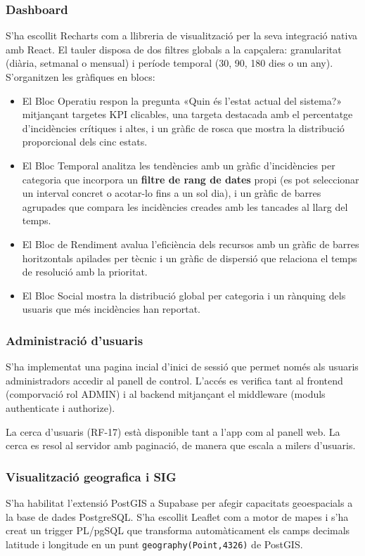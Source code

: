 \documentclass[10pt,a4paper,twocolumn,twoside]{article}
\begin{document}
		\subsubsection{Dashboard}
		S'ha escollit Recharts com a llibreria de visualització per la seva integració
		nativa amb React. El tauler disposa de dos filtres globals a la capçalera: granularitat (diària, setmanal o mensual) i període temporal (30, 90, 180 dies o un any). S'organitzen les gràfiques en blocs:
		
		\begin{itemize}
			\item El Bloc Operatiu respon la pregunta «Quin és l'estat actual del sistema?»
			mitjançant targetes KPI clicables, una targeta destacada amb el percentatge d'incidències crítiques i altes, i un gràfic de rosca que mostra la
			distribució proporcional dels cinc estats.
			\item El Bloc Temporal analitza les tendències amb un gràfic d'incidències per categoria que incorpora un \textbf{filtre de rang de dates} propi (es pot seleccionar un interval concret o acotar-lo fins a un sol dia), i un gràfic de barres agrupades que compara les incidències creades amb les tancades al llarg del temps.
			\item El Bloc de Rendiment avalua l'eficiència dels recursos amb un gràfic de
			barres horitzontals apilades per tècnic i un gràfic de dispersió que relaciona el temps de resolució amb la prioritat.
			\item El Bloc Social mostra la distribució global per categoria i un rànquing dels usuaris que més incidències han reportat.
		\end{itemize}
		
		
		\subsubsection{Administració d'usuaris}
		S'ha implementat una pagina incial d'inici de sessió que permet només als usuaris administradors accedir al panell de control. L'accés es verifica tant al frontend (comporvació rol ADMIN) i al backend mitjançant el middleware (moduls authenticate i authorize).
		
		La cerca d'usuaris (RF-17) està disponible tant a l'app com al panell web. La cerca es resol al servidor amb paginació, de manera que escala a milers d'usuaris.
		
		\subsubsection{Visualització geografica i SIG}
		S'ha habilitat l'extensió PostGIS a Supabase per afegir capacitats
		geoespacials a la base de dades PostgreSQL. S'ha escollit Leaflet com a motor de mapes i s'ha creat un trigger PL/pgSQL que transforma automàticament els camps decimals latitude i
		longitude en un punt \texttt{geography(Point,4326)} de PostGIS.
		
\end{document}

